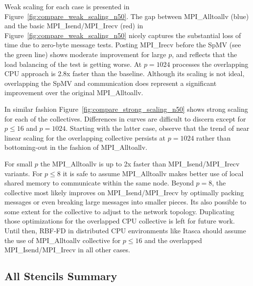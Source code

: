 \documentclass{report}
\begin{document}
\noindent Weak scaling for each case is presented in Figure~\ref{fig:compare_weak_scaling_n50}. The gap between MPI\_Alltoallv (blue) and the basic MPI\_Isend/MPI\_Irecv (red) in Figure~\ref{fig:compare_weak_scaling_n50} nicely captures the substantial loss of time due to zero-byte message tests. Posting MPI\_Irecv before the SpMV (see the green line) shows moderate improvement for large $p$, and reflects that the load balancing of the test is getting worse. At $p=1024$ processes the overlapping CPU approach is 2.8x faster than the baseline. Although its scaling is not ideal, overlapping the SpMV and communication does represent a significant improvement over the original MPI\_Alltoallv. %

In similar fashion Figure~\ref{fig:compare_strong_scaling_n50} shows strong scaling for each of the collectives. Differences in curves are difficult to discern except for $p \leq 16$ and $p = 1024$. Starting with the latter case, observe that the trend of near linear scaling for the overlapping collective persists at $p=1024$ rather than bottoming-out in the fashion of MPI\_Alltoallv. 

For small $p$ the MPI\_Alltoallv is up to 2x faster than MPI\_Isend/MPI\_Irecv variants. For $p\leq8$ it is safe to assume MPI\_Alltoallv makes better use of local shared memory to communicate within the same node. Beyond $p=8$, the collective most likely improves on MPI\_Isend/MPI\_Irecv by optimally packing messages or even breaking large messages into smaller pieces. Its also possible to some extent for the collective to adjust to the network topology. Duplicating those optimizations for the overlapped CPU collective is left for future work. Until then, RBF-FD in distributed CPU environments like Itasca should assume the use of MPI\_Alltoallv collective for $p \leq 16$ and the overlapped MPI\_Isend/MPI\_Irecv in all other cases. 

\subsection{All Stencils Summary}
\end{document}
